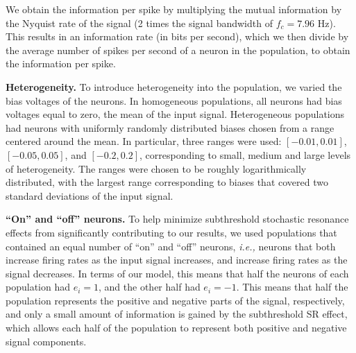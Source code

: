 \documentclass[12pt]{article}
\begin{document}
We obtain the information per spike by multiplying the mutual information by the Nyquist rate of the signal (2 times the signal bandwidth of $f_c = 7.96$ Hz). This results in an information rate (in bits per second), which we then divide by the average number of spikes per second of a neuron in the population, to obtain the information per spike.

\textbf{Heterogeneity.} To introduce heterogeneity into the population, we varied the bias voltages of the neurons. In homogeneous populations, all neurons had bias voltages equal to zero, the mean of the input signal. Heterogeneous populations had neurons with uniformly randomly distributed biases chosen from a range centered around the mean. In particular, three ranges were used: $[-0.01,0.01]$, $[-0.05,0.05]$, and $[-0.2,0.2]$, corresponding to small, medium and large levels of heterogeneity. The ranges were chosen to be roughly logarithmically distributed, with the largest range corresponding to biases that covered two standard deviations of the input signal.

\textbf{``On'' and ``off'' neurons.} To help minimize subthreshold stochastic resonance effects from significantly contributing to our results, we used populations that contained an equal number of ``on'' and ``off'' neurons, \emph{i.e.,} neurons that both increase firing rates as the input signal increases, and increase firing rates as the signal decreases. In terms of our model, this means that half the neurons of each population had $e_i = 1$, and the other half had $e_i = -1$. This means that half the population represents the positive and negative parts of the signal, respectively, and only a small amount of information is gained by the subthreshold SR effect, which allows each half of the population to represent both positive and negative signal components.
\end{document}
